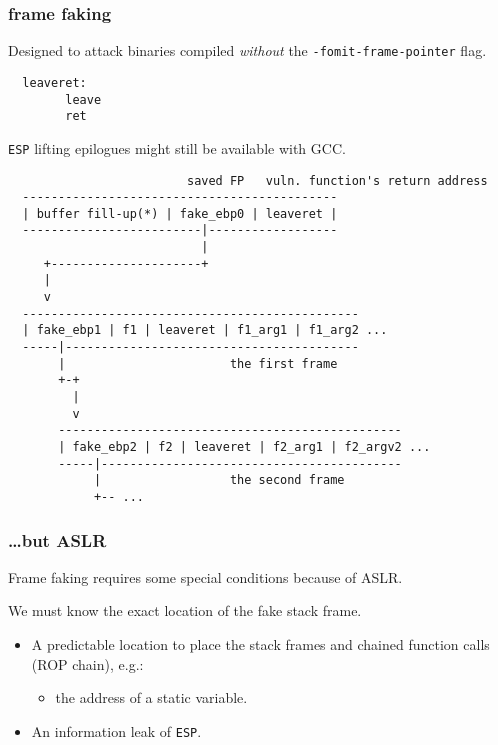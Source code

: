 \documentclass[10pt]{beamer}
\begin{document}
\begin{frame}[fragile]
  \frametitle{frame faking}
  Designed to attack binaries compiled \emph{without} the
  \texttt{-fomit-frame-pointer} flag.

  \begin{lstlisting}
  leaveret:
        leave
        ret
  \end{lstlisting}

  \texttt{ESP} lifting epilogues might still be available with GCC.
\end{frame}

\begin{frame}[fragile]
  \begin{lstlisting}
                         saved FP   vuln. function's return address
  --------------------------------------------
  | buffer fill-up(*) | fake_ebp0 | leaveret |
  -------------------------|------------------
                           |
     +---------------------+
     |
     v
  -----------------------------------------------
  | fake_ebp1 | f1 | leaveret | f1_arg1 | f1_arg2 ...
  -----|-----------------------------------------
       |                       the first frame
       +-+
         |
         v
       ------------------------------------------------
       | fake_ebp2 | f2 | leaveret | f2_arg1 | f2_argv2 ...
       -----|------------------------------------------
            |                  the second frame
            +-- ...
  \end{lstlisting}
\end{frame}


\begin{frame}
  \frametitle{\dots but ASLR}

  Frame faking requires some special conditions because of ASLR.

  We must know the exact location of the fake stack frame.

  \begin{itemize}
    \item A predictable location to place the stack frames and chained function
      calls (ROP chain), e.g.:
      \begin{itemize}
        \item the address of a static variable.
      \end{itemize}

    \item An information leak of \texttt{ESP}.
  \end{itemize}
\end{frame}
\end{document}
